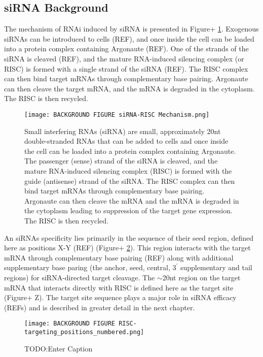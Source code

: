 \documentclass{report}
\begin{document}
\subsection{siRNA Background}

The mechanism of RNAi induced by siRNA is presented in Figure+  \ref{fig:Figure+ siRNA-RISC mechanism background}. Exogenous siRNAs can be introduced to cells (REF), and once inside the cell can be loaded into a protein complex containing Argonaute (REF). One of the strands of the siRNA is cleaved (REF), and the mature RNA-induced silencing complex (or RISC) is formed with a single strand of the siRNA (REF). The RISC complex can then bind target mRNAs through complementary base pairing. Argonaute can then cleave the target mRNA, and the mRNA is degraded in the cytoplasm. The RISC is then recycled. 

\begin{figure}
    \centering
    \texttt{[image: BACKGROUND FIGURE siRNA-RISC Mechanism.png]}
    \caption{Small interfering RNAs (siRNA) are small, approximately 20nt double-stranded RNAs that can be added to cells and once inside the cell can be loaded into a protein complex containing Argonaute. The passenger (sense) strand of the siRNA is cleaved, and the mature RNA-induced silencing complex (RISC) is formed with the guide (antisense) strand of the siRNA. The RISC complex can then bind target mRNAs through complementary base pairing. Argonaute can then cleave the mRNA and the mRNA is degraded in the cytoplasm leading to suppression of the target gene expression. The RISC is then recycled. }
    \label{fig:Figure+ siRNA-RISC mechanism background}
\end{figure}




An siRNAs specificity lies primarily in the sequence of their seed region, defined here as positions X-Y (REF) (Figure+ \ref{fig:Figure+ RISC targeting positions numbered}). This region interacts with the target mRNA through complementary base pairing (REF) along with additional supplementary base paring (the anchor, seed, central, $3^\prime$ supplementary and tail regions)  for siRNA-directed target cleavage. The $\sim$20nt region on the target mRNA that interacts directly with RISC is defined here as the target site (Figure+ Z). The target site sequence plays a major role in siRNA efficacy (REFs) and is described in greater detail in the next chapter. 

\begin{figure}
    \centering
    \texttt{[image: BACKGROUND FIGURE RISC-targeting\_positions\_numbered.png]}
    \caption{TODO:Enter Caption}
    \label{fig:Figure+ RISC targeting positions numbered}
\end{figure}
\end{document}
